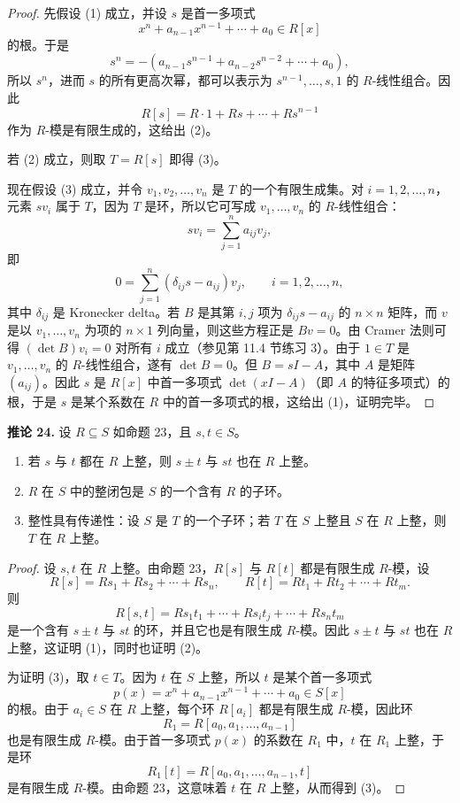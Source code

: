 \begin{proof}
	先假设 (1) 成立，并设 $s$ 是首一多项式
	\[
	x^n+a_{n-1}x^{n-1}+\cdots+a_0\in R[x]
	\]
	的根。于是
	\[
	s^n=-(a_{n-1}s^{n-1}+a_{n-2}s^{n-2}+\cdots+a_0),
	\]
	所以 $s^n$，进而 $s$ 的所有更高次幂，都可以表示为 $s^{n-1},\ldots,s,1$ 的 $R$-线性组合。因此
	\[
	R[s]=R\cdot 1+Rs+\cdots+Rs^{n-1}
	\]
	作为 $R$-模是有限生成的，这给出 (2)。
	
	若 (2) 成立，则取 $T=R[s]$ 即得 (3)。
	
	现在假设 (3) 成立，并令 $v_1,v_2,\ldots,v_n$ 是 $T$ 的一个有限生成集。对 $i=1,2,\ldots,n$，元素 $sv_i$ 属于 $T$，因为 $T$ 是环，所以它可写成 $v_1,\ldots,v_n$ 的 $R$-线性组合：
	\[
	sv_i=\sum_{j=1}^n a_{ij}v_j,
	\]
	即
	\[
	0=\sum_{j=1}^n(\delta_{ij}s-a_{ij})v_j,\qquad i=1,2,\ldots,n,
	\]
	其中 $\delta_{ij}$ 是 Kronecker delta。若 $B$ 是其第 $i,j$ 项为 $\delta_{ij}s-a_{ij}$ 的 $n\times n$ 矩阵，而 $v$ 是以 $v_1,\ldots,v_n$ 为项的 $n\times1$ 列向量，则这些方程正是 $Bv=0$。由 Cramer 法则可得 $(\det B)v_i=0$ 对所有 $i$ 成立（参见第 11.4 节练习 3）。由于 $1\in T$ 是 $v_1,\ldots,v_n$ 的 $R$-线性组合，遂有 $\det B=0$。但 $B=sI-A$，其中 $A$ 是矩阵 $(a_{ij})$。因此 $s$ 是 $R[x]$ 中首一多项式 $\det(xI-A)$（即 $A$ 的特征多项式）的根，于是 $s$ 是某个系数在 $R$ 中的首一多项式的根，这给出 (1)，证明完毕。
\end{proof}

\noindent\textbf{推论 24.} 设 $R\subseteq S$ 如命题 23，且 $s,t\in S$。
\begin{enumerate}[label=(\arabic*)]
	\item 若 $s$ 与 $t$ 都在 $R$ 上整，则 $s\pm t$ 与 $st$ 也在 $R$ 上整。
	\item $R$ 在 $S$ 中的整闭包是 $S$ 的一个含有 $R$ 的子环。
	\item 整性具有传递性：设 $S$ 是 $T$ 的一个子环；若 $T$ 在 $S$ 上整且 $S$ 在 $R$ 上整，则 $T$ 在 $R$ 上整。
\end{enumerate}

\begin{proof}
	设 $s,t$ 在 $R$ 上整。由命题 23，$R[s]$ 与 $R[t]$ 都是有限生成 $R$-模，设
	\[
	R[s]=Rs_1+Rs_2+\cdots+Rs_n,
	\qquad
	R[t]=Rt_1+Rt_2+\cdots+Rt_m.
	\]
	则
	\[
	R[s,t]=Rs_1t_1+\cdots+Rs_it_j+\cdots+Rs_nt_m
	\]
	是一个含有 $s\pm t$ 与 $st$ 的环，并且它也是有限生成 $R$-模。因此 $s\pm t$ 与 $st$ 也在 $R$ 上整，这证明 (1)，同时也证明 (2)。
	
	为证明 (3)，取 $t\in T$。因为 $t$ 在 $S$ 上整，所以 $t$ 是某个首一多项式
	\[
	p(x)=x^n+a_{n-1}x^{n-1}+\cdots+a_0\in S[x]
	\]
	的根。由于 $a_i\in S$ 在 $R$ 上整，每个环 $R[a_i]$ 都是有限生成 $R$-模，因此环
	\[
	R_1=R[a_0,a_1,\ldots,a_{n-1}]
	\]
	也是有限生成 $R$-模。由于首一多项式 $p(x)$ 的系数在 $R_1$ 中，$t$ 在 $R_1$ 上整，于是环
	\[
	R_1[t]=R[a_0,a_1,\ldots,a_{n-1},t]
	\]
	是有限生成 $R$-模。由命题 23，这意味着 $t$ 在 $R$ 上整，从而得到 (3)。
\end{proof}

